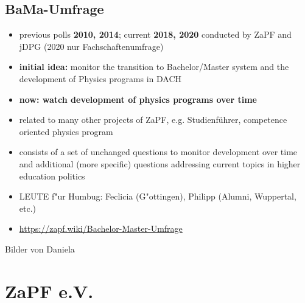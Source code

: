 \documentclass[compress, aspectratio=169]{beamer}
\newcommand{\red}[1]{{\color{ourred} \textbf{#1}}}
\newcommand{\blue}[1]{{\color{ourblue} \textbf{#1}}}
\begin{document}
\subsection{BaMa-Umfrage}
\begin{frame}{\insertsubsection}
	\vspace*{-3mm}
	\begin{itemize}
		\item previous polls \blue{2010, 2014}; current \blue{2018, 2020} conducted by ZaPF and jDPG (2020 nur Fachschaftenumfrage)
		\item \blue{initial idea:} monitor the transition to Bachelor/Master system and the development of Physics programs in DACH
		\item \red{now: watch development of physics programs over time}
		\item related to many other projects of ZaPF, e.g. Studienf\"uhrer, competence oriented physics program
		\pause
		\item consists of a set of unchanged questions to monitor development over time and additional (more specific) questions addressing current topics in higher education politics
		\item LEUTE f"ur Humbug: Feclicia (G"ottingen), Philipp (Alumni, Wuppertal, etc.)
		\item \url{https://zapf.wiki/Bachelor-Master-Umfrage}
	\end{itemize}
\end{frame}
\begin{frame}{\insertsubsection}
	Bilder von Daniela
\end{frame}

\section{ZaPF e.V.}
\end{document}
